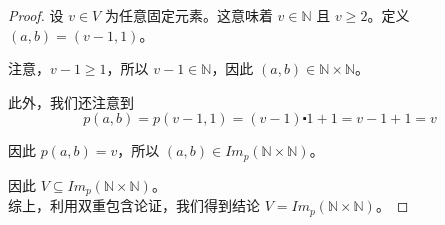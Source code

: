\begin{example}
\begin{proof}
        设 $v \in V$ 为任意固定元素。这意味着 $v \in \mathbb{N}$ 且 $v \ge 2$。定义 $(a, b) = (v - 1, 1)$。

        注意，$v - 1 \ge 1$，所以 $v-1 \in \mathbb{N}$，因此 $(a, b) \in \mathbb{N} \times \mathbb{N}$。

        此外，我们还注意到
        \[p(a, b) = p(v - 1, 1) = (v - 1) \centerdot 1 + 1 = v - 1 + 1 = v\]
        
        因此 $p(a, b) = v$，所以 $(a,b) \in Im_p(\mathbb{N} \times \mathbb{N})$。
        
        因此 $V \subseteq Im_p(\mathbb{N} \times \mathbb{N})$。\\

        综上，利用双重包含论证，我们得到结论 $V = Im_p(\mathbb{N} \times \mathbb{N})$。
    \end{proof}
\end{example}
